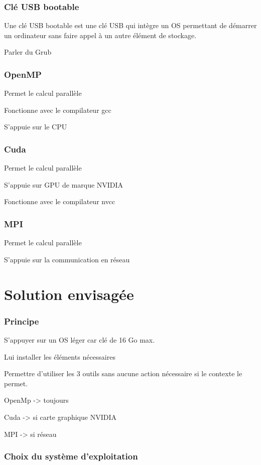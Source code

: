 \documentclass[final]{polytech/polytech}
\begin{document}
\section{Clé USB bootable}
Une clé USB bootable est une clé USB qui intègre un OS permettant de démarrer un ordinateur sans faire appel à un autre élément de stockage. 

Parler du Grub

\section{OpenMP}
Permet le calcul parallèle

Fonctionne avec le compilateur gcc

S'appuie sur le CPU

\section{Cuda}
Permet le calcul parallèle

S'appuie sur GPU de marque NVIDIA

Fonctionne avec le compilateur nvcc

\section{MPI}
Permet le calcul parallèle

S'appuie sur la communication en réseau

\part{Solution envisagée}

\section{Principe}
S'appuyer sur un OS léger car clé de 16 Go max.

Lui installer les éléments nécessaires

Permettre d'utiliser les 3 outils sans aucune action nécessaire si le contexte le permet.

OpenMp -> toujours

Cuda -> si carte graphique NVIDIA

MPI -> si réseau

\section{Choix du système d'exploitation}
\end{document}
